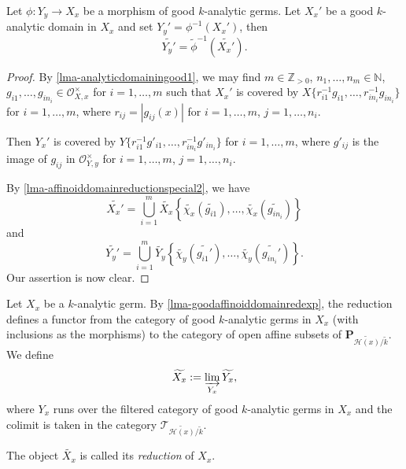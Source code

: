 \begin{lemma}
    Let $\phi:Y_y\rightarrow X_x$ be a morphism of good $k$-analytic germs. Let $X_x'$ be a good $k$-analytic domain in $X_x$ and set $Y_y'=\phi^{-1}(X_x')$, then 
    \[
        \widetilde{Y_y'}=\tilde{\phi}^{-1}(\widetilde{X_x'}).    
    \]
\end{lemma}
\begin{proof}
    By \cref{lma-analyticdomainingood1}, we may find $m\in \mathbb{Z}_{>0}$, $n_1,\ldots,n_m\in \mathbb{N}$, $g_{i1},\ldots,g_{in_i}\in \mathcal{O}_{X,x}^{\times}$ for $i=1,\ldots,m$ such that $X_x'$ is covered by $X\{r^{-1}_{i1}g_{i1},\ldots,r^{-1}_{in_i}g_{in_i} \}$ for $i=1,\ldots,m$, where $r_{ij}=|g_{ij}(x)|$ for $i=1,\ldots,m$, $j=1,\ldots,n_i$.

    Then $Y_x'$ is covered by $Y\{r^{-1}_{i1}g'_{i1},\ldots,r^{-1}_{in_i}g'_{in_i} \}$ for $i=1,\ldots,m$, where $g'_{ij}$ is the image of $g_{ij}$ in $\mathcal{O}_{Y,y}^{\times}$  for $i=1,\ldots,m$, $j=1,\ldots,n_i$.

    By \cref{lma-affinoiddomainreductionspecial2}, we have 
    \[
        \widetilde{X_x'}=\bigcup_{i=1}^m \widetilde{X_x}\left\{ \widetilde{\chi_{x}}(\widetilde{g_{i1}}),\ldots, \widetilde{\chi_{x}}(\widetilde{g_{in_i}}) \right\}
    \]
    and 
    \[
        \widetilde{Y_y'}=\bigcup_{i=1}^m \widetilde{Y_y}\left\{ \widetilde{\chi_{y}}(\widetilde{g_{i1}'}),\ldots, \widetilde{\chi_{y}}(\widetilde{g_{in_i}'}) \right\}.  
    \]
    Our assertion is now clear.
\end{proof}

\begin{definition}
    Let $X_x$ be a $k$-analytic germ. By \cref{lma-goodaffinoiddomainredexp}, the reduction defines a functor from the category of good $k$-analytic germs in $X_x$ (with inclusions as the morphisms) to the category of open affine subsets of $\mathbf{P}_{\widetilde{\mathscr{H}(x)}/\widetilde{k}}$. We define
    \[
        \widetilde{X_x}:=\varinjlim_{Y_x} \widetilde{Y_x},  
    \]
    where $Y_x$ runs over the filtered category of good $k$-analytic germs in $X_x$ and the colimit is taken in the category $\mathcal{T}_{\widetilde{\mathscr{H}(x)}/\widetilde{k}}$.

 The object $\widetilde{X_x}$ is called its \emph{reduction} of $X_x$.
\end{definition}

\iffalse
\begin{remark}
    There is some ambiguity at this point. Recall that by our definition, $\widetilde{k}$ is a $\sqrt{|k^{\times}|\cdot H}$-graded field instead of $H$-graded field. This is not consistent with our conventions in \cref{Commutative-sec-strictnessinRZ} in \nameref{Commutative-chap-commutative}.
    
    But thanks to \cref{Commutative-cor-Prestric1} in \nameref{Commutative-chap-commutative}, this inconsistency does not affect what we are doing in this section.
\end{remark}
\fi


